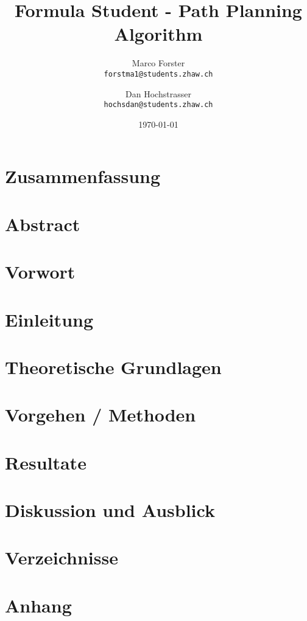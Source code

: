 \documentclass[a4paper, 12pt]{report}
\title{Formula Student - Path Planning Algorithm}
\author{
  Marco Forster\\
  \texttt{forstma1@students.zhaw.ch}
  \and
  Dan Hochstrasser\\
  \texttt{hochsdan@students.zhaw.ch}
}
\date{\today}
\begin{document}




\chapter*{Zusammenfassung}


\chapter*{Abstract}



\chapter*{Vorwort}


\tableofcontents

\chapter{Einleitung}


\chapter{Theoretische Grundlagen}


\chapter{Vorgehen / Methoden}


\chapter{Resultate}


\chapter{Diskussion und Ausblick}


\chapter{Verzeichnisse}


\appendix
\chapter{Anhang}

\end{document}
